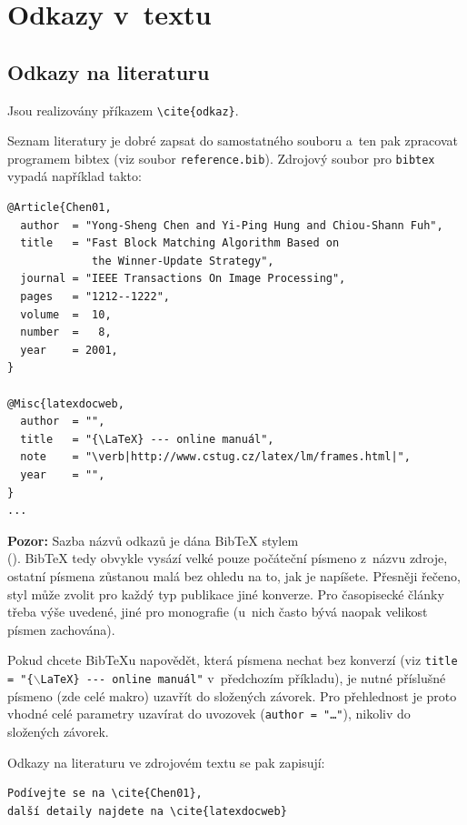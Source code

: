 \documentclass[11pt,twoside,a4paper]{book}
\begin{document}
\section{Odkazy v~textu}
\subsection{Odkazy na literaturu}
Jsou realizovány příkazem \verb|\cite{odkaz}|. 

Seznam literatury je dobré zapsat do samostatného souboru a~ten pak zpracovat programem bibtex (viz soubor
\verb|reference.bib|). Zdrojový soubor pro \verb|bibtex| vypadá například takto:
\begin{verbatim}
@Article{Chen01,
  author  = "Yong-Sheng Chen and Yi-Ping Hung and Chiou-Shann Fuh",
  title   = "Fast Block Matching Algorithm Based on 
             the Winner-Update Strategy",
  journal = "IEEE Transactions On Image Processing",
  pages   = "1212--1222",
  volume  =  10,
  number  =   8,
  year    = 2001,
}

@Misc{latexdocweb,
  author  = "",
  title   = "{\LaTeX} --- online manuál",
  note    = "\verb|http://www.cstug.cz/latex/lm/frames.html|",
  year    = "",
}
...
\end{verbatim}

\textbf{Pozor:} Sazba názvů odkazů je dána Bib\TeX{} stylem\\ (\verb||). 
Bib\TeX{} tedy obvykle vysází velké pouze počáteční písmeno z~názvu zdroje, 
ostatní písmena zůstanou malá bez ohledu na to, jak je napíšete. 
Přesněji řečeno, styl může zvolit pro každý typ publikace jiné konverze. 
Pro časopisecké články třeba výše uvedené, jiné pro monografie (u~nich často bývá 
naopak velikost písmen zachována).

Pokud chcete Bib\TeX u napovědět, která písmena nechat bez konverzí 
(viz \texttt{title = "\{$\backslash$LaTeX\} -{}-{}- online manuál"} 
v~předchozím příkladu), je nutné příslušné písmeno (zde celé makro) uzavřít 
do složených závorek. Pro přehlednost je proto vhodné celé parametry 
uzavírat do uvozovek (\texttt{author = "\dots"}), nikoliv do složených závorek.

Odkazy na literaturu ve zdrojovém textu se pak zapisují:
\begin{verbatim}
Podívejte se na \cite{Chen01}, 
další detaily najdete na \cite{latexdocweb}
\end{verbatim}
\end{document}
